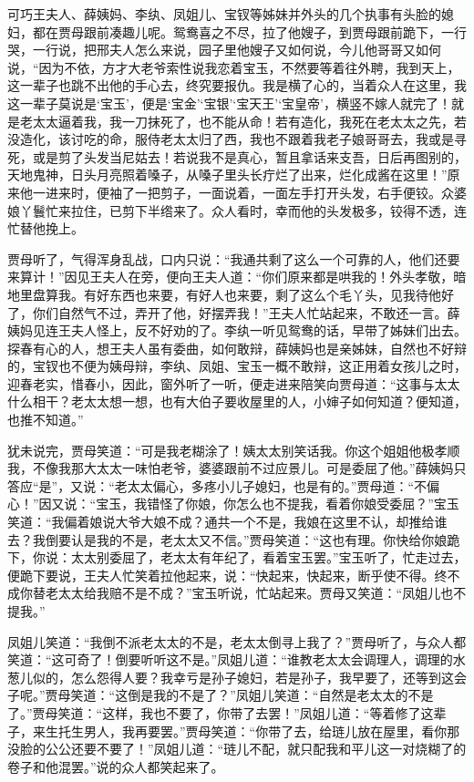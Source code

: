 \documentclass[12pt,oneside]{book}
\begin{document}
可巧王夫人、薛姨妈、李纨、凤姐儿、宝钗等姊妹并外头的几个执事有头脸的媳妇，都在贾母跟前凑趣儿呢。鸳鸯喜之不尽，拉了他嫂子，到贾母跟前跪下，一行哭，一行说，把邢夫人怎么来说，园子里他嫂子又如何说，今儿他哥哥又如何说，“因为不依，方才大老爷索性说我恋着宝玉，不然要等着往外聘，我到天上，这一辈子也跳不出他的手心去，终究要报仇。我是横了心的，当着众人在这里，我这一辈子莫说是‘宝玉’，便是‘宝金’‘宝银’‘宝天王’‘宝皇帝’，横竖不嫁人就完了！就是老太太逼着我，我一刀抹死了，也不能从命！若有造化，我死在老太太之先，若没造化，该讨吃的命，服侍老太太归了西，我也不跟着我老子娘哥哥去，我或是寻死，或是剪了头发当尼姑去！若说我不是真心，暂且拿话来支吾，日后再图别的，天地鬼神，日头月亮照着嗓子，从嗓子里头长疔烂了出来，烂化成酱在这里！”原来他一进来时，便袖了一把剪子，一面说着，一面左手打开头发，右手便铰。众婆娘丫鬟忙来拉住，已剪下半绺来了。众人看时，幸而他的头发极多，铰得不透，连忙替他挽上。

贾母听了，气得浑身乱战，口内只说：“我通共剩了这么一个可靠的人，他们还要来算计！”因见王夫人在旁，便向王夫人道：“你们原来都是哄我的！外头孝敬，暗地里盘算我。有好东西也来要，有好人也来要，剩了这么个毛丫头，见我待他好了，你们自然气不过，弄开了他，好摆弄我！”王夫人忙站起来，不敢还一言。薛姨妈见连王夫人怪上，反不好劝的了。李纨一听见鸳鸯的话，早带了姊妹们出去。探春有心的人，想王夫人虽有委曲，如何敢辩，薛姨妈也是亲姊妹，自然也不好辩的，宝钗也不便为姨母辩，李纨、凤姐、宝玉一概不敢辩，这正用着女孩儿之时，迎春老实，惜春小，因此，窗外听了一听，便走进来陪笑向贾母道：“这事与太太什么相干？老太太想一想，也有大伯子要收屋里的人，小婶子如何知道？便知道，也推不知道。”

犹未说完，贾母笑道：“可是我老糊涂了！姨太太别笑话我。你这个姐姐他极孝顺我，不像我那大太太一味怕老爷，婆婆跟前不过应景儿。可是委屈了他。”薛姨妈只答应“是”，又说：“老太太偏心，多疼小儿子媳妇，也是有的。”贾母道：“不偏心！”因又说：“宝玉，我错怪了你娘，你怎么也不提我，看着你娘受委屈？”宝玉笑道：“我偏着娘说大爷大娘不成？通共一个不是，我娘在这里不认，却推给谁去？我倒要认是我的不是，老太太又不信。”贾母笑道：“这也有理。你快给你娘跪下，你说：太太别委屈了，老太太有年纪了，看着宝玉罢。”宝玉听了，忙走过去，便跪下要说，王夫人忙笑着拉他起来，说：“快起来，快起来，断乎使不得。终不成你替老太太给我赔不是不成？”宝玉听说，忙站起来。贾母又笑道：“凤姐儿也不提我。”

凤姐儿笑道：“我倒不派老太太的不是，老太太倒寻上我了？”贾母听了，与众人都笑道：“这可奇了！倒要听听这不是。”凤姐儿道：“谁教老太太会调理人，调理的水葱儿似的，怎么怨得人要？我幸亏是孙子媳妇，若是孙子，我早要了，还等到这会子呢。”贾母笑道：“这倒是我的不是了？”凤姐儿笑道：“自然是老太太的不是了。”贾母笑道：“这样，我也不要了，你带了去罢！”凤姐儿道：“等着修了这辈子，来生托生男人，我再要罢。”贾母笑道：“你带了去，给琏儿放在屋里，看你那没脸的公公还要不要了！”凤姐儿道：“琏儿不配，就只配我和平儿这一对烧糊了的卷子和他混罢。”说的众人都笑起来了。
\end{document}
